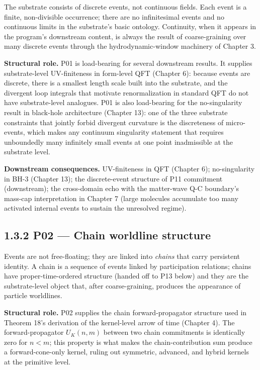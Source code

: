 \documentclass[11pt]{book}
\begin{document}
The substrate consists of discrete events, not continuous fields. Each event is a finite, non-divisible occurrence; there are no infinitesimal events and no continuous limits in the substrate's basic ontology. Continuity, when it appears in the program's downstream content, is always the result of coarse-graining over many discrete events through the hydrodynamic-window machinery of Chapter 3.

\textbf{Structural role.} P01 is load-bearing for several downstream results. It supplies substrate-level UV-finiteness in form-level QFT (Chapter 6): because events are discrete, there is a smallest length scale built into the substrate, and the divergent loop integrals that motivate renormalization in standard QFT do not have substrate-level analogues. P01 is also load-bearing for the no-singularity result in black-hole architecture (Chapter 13): one of the three substrate constraints that jointly forbid divergent curvature is the discreteness of micro-events, which makes any continuum singularity statement that requires unboundedly many infinitely small events at one point inadmissible at the substrate level.

\textbf{Downstream consequences.} UV-finiteness in QFT (Chapter 6); no-singularity in BH-3 (Chapter 13); the discrete-event structure of P11 commitment (downstream); the cross-domain echo with the matter-wave Q-C boundary's mass-cap interpretation in Chapter 7 (large molecules accumulate too many activated internal events to sustain the unresolved regime).

\subsection{1.3.2 P02 — Chain worldline structure}

Events are not free-floating; they are linked into \textit{chains} that carry persistent identity. A chain is a sequence of events linked by participation relations; chains have proper-time-ordered structure (handed off to P13 below) and they are the substrate-level object that, after coarse-graining, produces the appearance of particle worldlines.

\textbf{Structural role.} P02 supplies the chain forward-propagator structure used in Theorem 18's derivation of the kernel-level arrow of time (Chapter 4). The forward-propagator $U_K(n,m)$ between two chain commitments is identically zero for $n < m$; this property is what makes the chain-contribution sum produce a forward-cone-only kernel, ruling out symmetric, advanced, and hybrid kernels at the primitive level.
\end{document}
